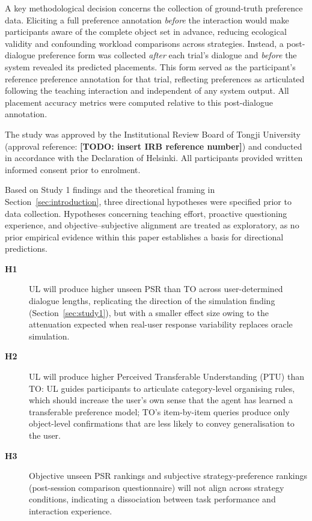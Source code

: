 \documentclass[manuscript,review,anonymous]{acmart}
\begin{document}
A key methodological decision concerns the collection of ground-truth preference data. Eliciting a full preference annotation \textit{before} the interaction would make participants aware of the complete object set in advance, reducing ecological validity and confounding workload comparisons across strategies. Instead, a post-dialogue preference form was collected \textit{after} each trial's dialogue and \textit{before} the system revealed its predicted placements. This form served as the participant's reference preference annotation for that trial, reflecting preferences as articulated following the teaching interaction and independent of any system output. All placement accuracy metrics were computed relative to this post-dialogue annotation.

The study was approved by the Institutional Review Board of Tongji University (approval reference: \textbf{[TODO: insert IRB reference number]}) and conducted in accordance with the Declaration of Helsinki. All participants provided written informed consent prior to enrolment.

Based on Study 1 findings and the theoretical framing in Section~\ref{sec:introduction}, three directional hypotheses were specified prior to data collection. Hypotheses concerning teaching effort, proactive questioning experience, and objective--subjective alignment are treated as exploratory, as no prior empirical evidence within this paper establishes a basis for directional predictions.

\begin{description}
  \item[\textbf{H1}] UL will produce higher unseen PSR than TO across user-determined dialogue lengths, replicating the direction of the simulation finding (Section~\ref{sec:study1}), but with a smaller effect size owing to the attenuation expected when real-user response variability replaces oracle simulation.
  \item[\textbf{H2}] UL will produce higher Perceived Transferable Understanding (PTU) than TO: UL guides participants to articulate category-level organising rules, which should increase the user's own sense that the agent has learned a transferable preference model; TO's item-by-item queries produce only object-level confirmations that are less likely to convey generalisation to the user.
  \item[\textbf{H3}] Objective unseen PSR rankings and subjective strategy-preference rankings (post-session comparison questionnaire) will not align across strategy conditions, indicating a dissociation between task performance and interaction experience.
\end{description}
\end{document}
